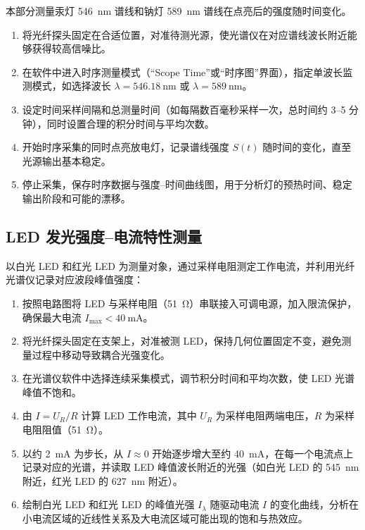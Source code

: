\documentclass[a4paper,8pt,twocolumn]{article}
\begin{document}
本部分测量汞灯 \SI{546}{\nano\meter} 谱线和钠灯 \SI{589}{\nano\meter} 谱线在点亮后的强度随时间变化。

\begin{enumerate}[label=\arabic*)]
  \item 将光纤探头固定在合适位置，对准待测光源，使光谱仪在对应谱线波长附近能够获得较高信噪比。
  \item 在软件中进入时序测量模式（“Scope Time”或“时序图”界面），指定单波长监测模式，如选择波长 $\lambda=\SI{546.18}{\nano\meter}$ 或 $\lambda=\SI{589}{\nano\meter}$。
  \item 设定时间采样间隔和总测量时间（如每隔数百毫秒采样一次，总时间约 3--5 分钟），同时设置合理的积分时间与平均次数。
  \item 开始时序采集的同时点亮放电灯，记录谱线强度 $S(t)$ 随时间的变化，直至光源输出基本稳定。
  \item 停止采集，保存时序数据与强度–时间曲线图，用于分析灯的预热时间、稳定输出阶段和可能的漂移。
\end{enumerate}

\subsection{LED 发光强度–电流特性测量}

以白光 LED 和红光 LED 为测量对象，通过采样电阻测定工作电流，并利用光纤光谱仪记录对应波段峰值强度：

\begin{enumerate}[label=\arabic*)]
  \item 按照电路图将 LED 与采样电阻（\SI{51}{\ohm}）串联接入可调电源，加入限流保护，确保最大电流 $I_{\max}<\SI{40}{\milli\ampere}$。
  \item 将光纤探头固定在支架上，对准被测 LED，保持几何位置固定不变，避免测量过程中移动导致耦合光强变化。
  \item 在光谱仪软件中选择连续采集模式，调节积分时间和平均次数，使 LED 光谱峰值不饱和。
  \item 由 $I=U_R/R$ 计算 LED 工作电流，其中 $U_R$ 为采样电阻两端电压，$R$ 为采样电阻阻值（\SI{51}{\ohm}）。
  \item 以约 \SI{2}{\milli\ampere} 为步长，从 $I\approx 0$ 开始逐步增大至约 \SI{40}{\milli\ampere}，在每一个电流点上记录对应的光谱，并读取 LED 峰值波长附近的光强（如白光 LED 的 \SI{545}{\nano\meter} 附近，红光 LED 的 \SI{627}{\nano\meter} 附近）。
  \item 绘制白光 LED 和红光 LED 的峰值光强 $I_{\lambda}$ 随驱动电流 $I$ 的变化曲线，分析在小电流区域的近线性关系及大电流区域可能出现的饱和与热效应。
\end{enumerate}
\end{document}
